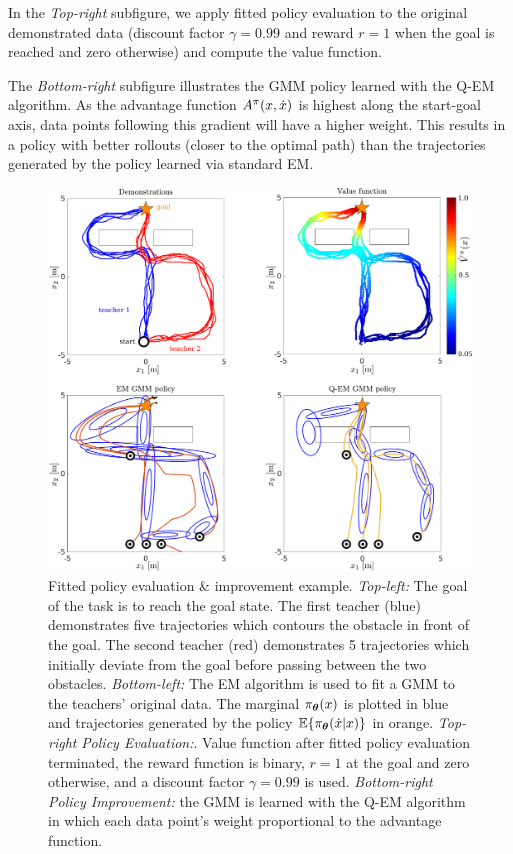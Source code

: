 In the \textit{Top-right} subfigure, we apply fitted policy evaluation to the original demonstrated data (discount 
factor $\gamma=0.99$ and reward $r=1$ when the goal is reached and zero otherwise) and compute the value function.

The \textit{Bottom-right} subfigure illustrates the GMM policy learned with the Q-EM algorithm. As 
the advantage function $ A^{\pi}(x,\dot{x})$ is highest along the start-goal axis, data points
following this gradient will have a higher weight. This results in a policy with better 
rollouts (closer to the optimal path) than the trajectories generated by the policy learned via standard EM. 

\begin{figure}
 \centering
 \setlength\fboxsep{0pt}
  \setlength\fboxrule{0.25pt}
  \includegraphics[width=\textwidth]{./ch4-PiH/Figures/fpe_example.pdf}
 \caption{Fitted policy evaluation \& improvement example. 
  \textit{Top-left:} The goal of the task is to reach the goal state. The first teacher (blue) demonstrates 
  five trajectories which contours the obstacle in front of the goal. The second teacher (red) demonstrates 
  5 trajectories which initially deviate from the goal before passing between the two obstacles. 
  \textit{Bottom-left:} The EM algorithm is used to fit a GMM to the teachers' original data. 
  The marginal $\pi_{\boldsymbol{\theta}}(x)$ is plotted in blue and trajectories generated by the 
  policy $\mathbb{E}\{\pi_{\boldsymbol{\theta}}(\dot{x}|x)\}$ in orange. \textit{Top-right} \textit{Policy Evaluation:}.  
  Value function after fitted policy evaluation terminated, the reward function 
  is binary, $r=1$ at the goal and zero otherwise, and a discount factor $\gamma = 0.99$ is used.
  \textit{Bottom-right} \textit{Policy Improvement:} the GMM is learned with the Q-EM algorithm in which 
  each data point's weight proportional to the advantage function.
 }
  \label{fig:fpe_example}
\end{figure}

